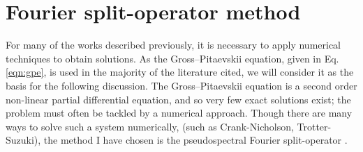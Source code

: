\section{Fourier split-operator method}\label{sec:numerics}
For many of the works described previously, it is necessary to apply numerical techniques to obtain solutions. As the Gross--Pitaevskii
equation, given in Eq. \eqref{eqn:gpe}, is used in the majority of the literature cited, we will consider it as the basis for the following discussion. The Gross--Pitaevskii equation is a second order non-linear partial differential equation, and so very few exact solutions exist; the problem must often be tackled by a numerical approach. Though there are many ways to solve such a system numerically, (such as Crank-Nicholson, Trotter-Suzuki), the method I have chosen is the pseudospectral Fourier split-operator \cite{Num:Bauke_cpc_2011}.

